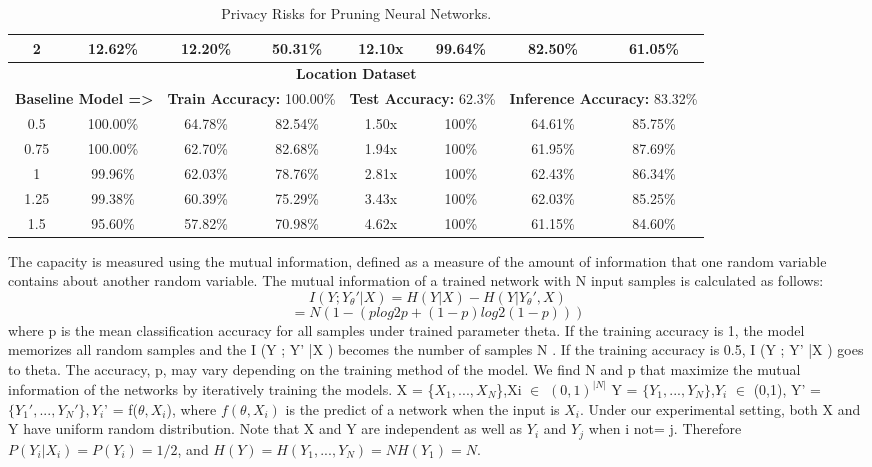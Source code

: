 \begin{table*}[!htb]
\begin{center}
\begin{tabular}{|c|c|c|c|c|c|c|c|}
2 & 12.62\% & 12.20\% & \cellcolor{green!25}50.31\% & 12.10x & 99.64\% & 82.50\% & \cellcolor{red!25}61.05\%\\
\hline
\hline
\multicolumn{8}{|c|}{\textbf{Location Dataset}}\\
\multicolumn{2}{|c}{\textbf{Baseline Model =>}} & \multicolumn{2}{c}{\textbf{Train Accuracy:} 100.00\%} & \multicolumn{2}{c}{\textbf{Test Accuracy:} 62.3\%} & \multicolumn{2}{c|}{\textbf{Inference Accuracy:} 83.32\%}\\
\hline
0.5 & 100.00\% & 64.78\% & \cellcolor{green!25}82.54\% & 1.50x & 100\% & 64.61\% & \cellcolor{red!25}85.75\%\\
0.75 & 100.00\% & 62.70\% & \cellcolor{green!25}82.68\% & 1.94x & 100\% & 61.95\% & \cellcolor{red!25}87.69\%\\
1 & 99.96\% & 62.03\% & \cellcolor{green!25}78.76\% & 2.81x & 100\% & 62.43\% & \cellcolor{red!25}86.34\%\\
1.25 & 99.38\% & 60.39\% & \cellcolor{green!25}75.29\% & 3.43x & 100\% & 62.03\% & \cellcolor{red!25}85.25\%\\
1.5 & 95.60\% & 57.82\% & \cellcolor{green!25}70.98\% & 4.62x & 100\% & 61.15\% & \cellcolor{red!25}84.60\%\\
\hline
\end{tabular}
\end{center}
\caption{Privacy Risks for Pruning Neural Networks.}
\label{fmnist_pruning}
\end{table*}





\cite{45932}\cite{cap}
The capacity is measured using the mutual information, defined as a measure of the amount of information that one random variable contains about another random variable. The mutual information of a trained network with N input samples is calculated as follows:
\begin{equation}
I ( Y ; Y_{\theta}' | X ) = H ( Y | X ) - H ( Y | Y_{\theta}' , X )
\end{equation}
\begin{equation}
=N (1-(plog2 p+(1-p)log2 (1-p)) )
\end{equation}
where p is the mean classification accuracy for all samples under trained parameter theta. If the training accuracy is 1, the model memorizes all random samples and the I (Y ; Y' |X ) becomes the number
of samples N . If the training accuracy is 0.5, I (Y ; Y' |X ) goes to theta.
The accuracy, p, may vary depending on the training method of the model. We find N and p that maximize the mutual information of the networks by iteratively training the models.
X = \{$X_1,...,X_N$\},Xi $\in$ $(0,1)^{|N|}$
Y = $\{Y_1,...,Y_N\}$,$Y_i$ $\in$ (0,1),
Y' = $\{Y_1', ..., Y_N'\}, Y_i$' = f($\theta, X_i$),
where $f(\theta,X_i)$ is the predict of a network when the input is $X_i$. Under our experimental setting, both X and Y have uniform random distribution. Note that X and Y are independent as well as $Y_i$ and $Y_j$ when i not= j. Therefore
$P (Y_i|X_i) = P (Y_i) = 1/2$, and $H(Y) = H(Y_1, ..., Y_N ) = N H(Y_1) = N$.

